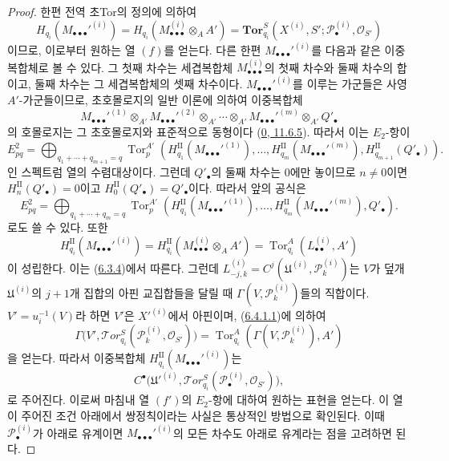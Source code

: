 \begin{proof}
한편 전역 초Tor의 정의에 의하여
\[
  H_{q_i}(M_{\bullet\bullet\bullet}'^{(i)})
  =H_{q_i}(M_{\bullet\bullet\bullet}^{(i)}\otimes_A A')
  =\mathbf{Tor}_{q_i}^S
  (X^{(i)},S';\mathscr P_\bullet^{(i)},\mathscr O_{S'})
\]
이므로, 이로부터 원하는 열 $(f)$를 얻는다. 다른 한편
$M_{\bullet\bullet\bullet}'^{(i)}$를 다음과 같은 이중복합체로 볼 수
있다. 그 첫째 차수는 세겹복합체
$M_{\bullet\bullet\bullet}^{(i)}$의 첫째 차수와 둘째 차수의 합이고,
둘째 차수는 그 세겹복합체의 셋째 차수이다.
$M_{\bullet\bullet\bullet}'^{(i)}$를 이루는 가군들은 사영
$A'$-가군들이므로, 초호몰로지의 일반 이론에 의하여 이중복합체
\[
  M_{\bullet\bullet\bullet}'^{(1)}\otimes_{A'}
  M_{\bullet\bullet\bullet}'^{(2)}\otimes_{A'}\cdots\otimes_{A'}
  M_{\bullet\bullet\bullet}'^{(m)}\otimes_{A'} Q'_\bullet
\]
의 호몰로지는 그 초호몰로지와 표준적으로 동형이다
(\hyperref[0.11.6.5-fr]{0, 11.6.5}). 따라서 이는 $E_2$-항이
\[
  E_{pq}^2
  =\bigoplus_{q_1+\cdots+q_{m+1}=q}
  \operatorname{Tor}_p^{A'}
  (H_{q_1}^{\mathrm{II}}(M_{\bullet\bullet\bullet}'^{(1)}),\ldots,
   H_{q_m}^{\mathrm{II}}(M_{\bullet\bullet\bullet}'^{(m)}),
   H_{q_{m+1}}^{\mathrm{II}}(Q'_\bullet)).
\]
인 스펙트럼 열의 수렴대상이다. 그런데 $Q'_\bullet$의 둘째 차수는
$0$에만 놓이므로 $n\ne0$이면
$H_n^{\mathrm{II}}(Q'_\bullet)=0$이고
$H_0^{\mathrm{II}}(Q'_\bullet)=Q'_\bullet$이다. 따라서 앞의 공식은
\[
  E_{pq}^2
  =\bigoplus_{q_1+\cdots+q_m=q}
  \operatorname{Tor}_p^{A'}
  (H_{q_1}^{\mathrm{II}}(M_{\bullet\bullet\bullet}'^{(1)}),\ldots,
   H_{q_m}^{\mathrm{II}}(M_{\bullet\bullet\bullet}'^{(m)}),Q'_\bullet).
\]
로도 쓸 수 있다. 또한
\[
  H_{q_i}^{\mathrm{II}}(M_{\bullet\bullet\bullet}'^{(i)})
  =H_{q_i}^{\mathrm{II}}(M_{\bullet\bullet\bullet}^{(i)}\otimes_A A')
  =\operatorname{Tor}_{q_i}^A(L_{\bullet\bullet}^{(i)},A')
\]
이 성립한다. 이는 (\hyperref[III.6.3.4-fr]{6.3.4})에서 따른다.
그런데
$L_{-j,k}^{(i)}=C^j(\mathfrak U^{(i)},\mathscr P_k^{(i)})$는
$V$가 덮개 $\mathfrak U^{(i)}$의 $j+1$개 집합의 아핀 교집합들을
달릴 때 $\Gamma(V,\mathscr P_k^{(i)})$들의 직합이다.
$V'=u_i^{-1}(V)$라 하면 $V'$은 $X'^{(i)}$에서 아핀이며,
(\hyperref[III.6.4.1.1.fr]{6.4.1.1})에 의하여
\[
  \Gamma\bigl(V',\mathscr{T}\!or_{q_i}^S
  (\mathscr P_k^{(i)},\mathscr O_{S'})\bigr)
  =\operatorname{Tor}_{q_i}^A(\Gamma(V,\mathscr P_k^{(i)}),A')
\]
을 얻는다. 따라서 이중복합체
$H_{q_i}^{\mathrm{II}}(M_{\bullet\bullet\bullet}'^{(i)})$는
\[
  C^\bullet\bigl(\mathfrak U'^{(i)},
  \mathscr{T}\!or_{q_i}^S(\mathscr P_\bullet^{(i)},\mathscr O_{S'})\bigr),
\]
로 주어진다. 이로써 마침내 열 $(f')$의 $E_2$-항에 대하여 원하는
표현을 얻는다. 이 열이 주어진 조건 아래에서 쌍정칙이라는 사실은
통상적인 방법으로 확인된다. 이때 $\mathscr P_\bullet^{(i)}$가
아래로 유계이면
$M_{\bullet\bullet\bullet}'^{(i)}$의 모든 차수도 아래로 유계라는
점을 고려하면 된다.
\end{proof}

